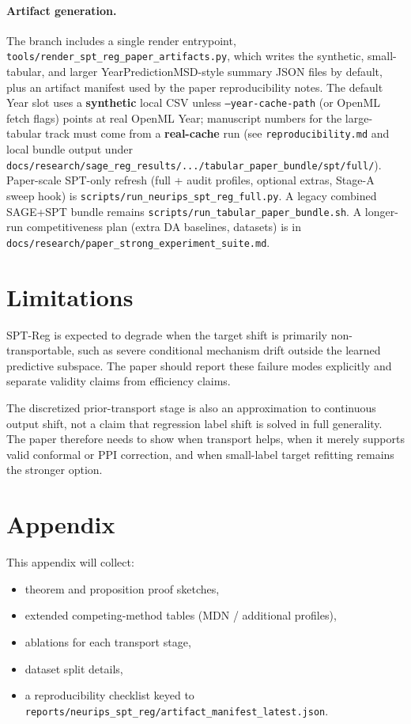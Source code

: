 \documentclass{article}
\begin{document}
\paragraph{Artifact generation.}
The branch includes a single render entrypoint,
\texttt{tools/render\_spt\_reg\_paper\_artifacts.py}, which writes the
synthetic, small-tabular, and larger YearPredictionMSD-style summary JSON
files by default, plus an artifact manifest used by the paper reproducibility
notes. The default Year slot uses a \textbf{synthetic} local CSV unless
\texttt{--year-cache-path} (or OpenML fetch flags) points at real OpenML Year;
manuscript numbers for the large-tabular track must come from a
\textbf{real-cache} run (see \texttt{reproducibility.md} and local bundle output
under \texttt{docs/research/sage\_reg\_results/.../tabular\_paper\_bundle/spt/full/}).
Paper-scale SPT-only refresh (full + audit profiles, optional extras, Stage-A sweep hook)
is \texttt{scripts/run\_neurips\_spt\_reg\_full.py}. A legacy combined SAGE+SPT
bundle remains \texttt{scripts/run\_tabular\_paper\_bundle.sh}. A longer-run
competitiveness plan (extra DA baselines, datasets) is in
\texttt{docs/research/paper\_strong\_experiment\_suite.md}.

\section{Limitations}

SPT-Reg is expected to degrade when the target shift is primarily
non-transportable, such as severe conditional mechanism drift outside the
learned predictive subspace. The paper should report these failure modes
explicitly and separate validity claims from efficiency claims.

The discretized prior-transport stage is also an approximation to continuous
output shift, not a claim that regression label shift is solved in full
generality. The paper therefore needs to show when transport helps, when it
merely supports valid conformal or PPI correction, and when small-label target
refitting remains the stronger option.




\appendix

\section{Appendix}

This appendix will collect:
\begin{itemize}
  \item theorem and proposition proof sketches,
  \item extended competing-method tables (MDN / additional profiles),
  \item ablations for each transport stage,
  \item dataset split details,
  \item a reproducibility checklist keyed to
  \texttt{reports/neurips\_spt\_reg/artifact\_manifest\_latest.json}.
\end{itemize}
\end{document}
